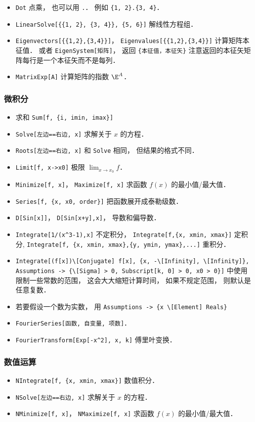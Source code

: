 \begin{itemize}
\item \verb|Dot| 点乘， 也可以用 \verb|.|． 例如 \verb|{1, 2}.{3, 4}|．
\item \verb|LinearSolve[{{1, 2}, {3, 4}}, {5, 6}]| 解线性方程组．
\item \verb|Eigenvectors[{{1,2},{3,4}}]|， \verb|Eigenvalues[{{1,2},{3,4}}]| 计算矩阵本征值． 或者 \verb|EigenSystem[矩阵]|， 返回 \verb|{本征值，本征矢}| 注意返回的本征矢矩阵每行是一个本征矢而不是每列．
\item \verb|MatrixExp[A]| 计算矩阵的指数 $\E^{A}$．
\end{itemize}

\subsubsection{微积分}
\begin{itemize}
\item 求和 \verb|Sum[f, {i, imin, imax}]|
\item \verb|Solve[左边==右边, x]| 求解关于 $x$ 的方程．
\item \verb|Roots[左边==右边, x]| 和 \verb|Solve| 相同， 但结果的格式不同．
\item \verb|Limit[f, x->x0]| 极限 $\lim_{x\to x_0} f$．
\item \verb|Minimize[f, x]|， \verb|Maximize[f, x]| 求函数 $f(x)$ 的最小值/最大值．
\item \verb|Series[f, {x, x0, order}]| 把函数展开成泰勒级数．
\item \verb|D[Sin[x]]|， \verb|D[Sin[x+y],x]|， 导数和偏导数．
\item \verb|Integrate[1/(x^3-1),x]| 不定积分， \verb|Integrate[f,{x, xmin, xmax}]| 定积分, \verb|Integrate[f, {x, xmin, xmax},{y, ymin, ymax},...]| 重积分．
\item \verb|Integrate[(f[x])\[Conjugate] f[x], {x, -\[Infinity], \[Infinity]}, Assumptions -> {\[Sigma] > 0, Subscript[k, 0] > 0, x0 > 0}]| 中使用限制一些常数的范围， 这会大大缩短计算时间， 如果不规定范围， 则默认是任意复数．
\item 若要假设一个数为实数， 用 \verb|Assumptions -> {x \[Element] Reals}|
\item \verb|FourierSeries[函数, 自变量, 项数]|．
\item \verb|FourierTransform[Exp[-x^2], x, k]| 傅里叶变换．
\end{itemize}

\subsubsection{数值运算}
\begin{itemize}
\item \verb|NIntegrate[f, {x, xmin, xmax}]| 数值积分．
\item \verb|NSolve[左边==右边, x]| 求解关于 $x$ 的方程．
\item \verb|NMinimize[f, x]|， \verb|NMaximize[f, x]| 求函数 $f(x)$ 的最小值/最大值．
\end{itemize}

